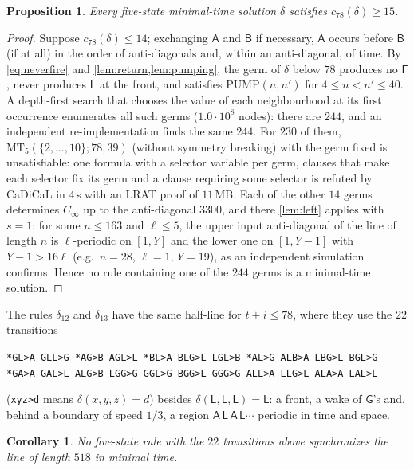 \documentclass[3p]{elsarticle}
\newtheorem{proposition}[theorem]{Proposition}
\newtheorem{corollary}[theorem]{Corollary}
\theoremstyle{definition}
\newcommand{\Lq}{\mathsf L}
\newcommand{\Gq}{\mathsf G}
\newcommand{\Aq}{\mathsf A}
\newcommand{\Bq}{\mathsf B}
\newcommand{\Fq}{\mathsf F}
\begin{document}
\begin{proposition}\label{prop:germs}
Every five-state minimal-time solution $\delta$ satisfies $c_{78}(\delta)\ge15$.
\end{proposition}

\begin{proof}
Suppose $c_{78}(\delta)\le14$; exchanging $\Aq$ and $\Bq$ if necessary, $\Aq$
occurs before $\Bq$ (if at all) in the order of anti-diagonals and, within an
anti-diagonal, of time. By \eqref{eq:neverfire} and
\cref{lem:return,lem:pumping}, the germ of $\delta$ below $78$ produces no
$\Fq$, never produces $\Lq$ at the front, and satisfies $\mathrm{PUMP}(n,n')$
for $4\le n<n'\le40$. A depth-first search that chooses the value of each
neighbourhood at its first occurrence enumerates all such germs
($1.0\cdot10^8$ nodes): there are $244$, and an independent re-implementation
finds the same $244$. For $230$ of them, $\mathrm{MT}_5(\{2,\dots,10\};78,39)$
(without symmetry breaking) with the germ fixed is unsatisfiable: one formula
with a selector variable per germ, clauses that make each selector fix its
germ and a clause requiring some selector is refuted by CaDiCaL in $4$\,s with
an LRAT proof of $11$\,MB. Each of the other $14$ germs determines $C_\infty$
up to the anti-diagonal $3300$, and there \cref{lem:left} applies with $s=1$:
for some $n\le163$ and $\ell\le5$, the upper input anti-diagonal of the line of
length $n$ is $\ell$-periodic on $[1,Y]$ and the lower one on $[1,Y-1]$ with
$Y-1>16\ell$ (e.g.\ $n=28$, $\ell=1$, $Y=19$), as an independent simulation
confirms. Hence no rule containing one of the $244$ germs is a minimal-time
solution.
\end{proof}

The rules $\delta_{12}$ and $\delta_{13}$ have the same half-line for
$t+i\le78$, where they use the $22$ transitions
\begin{center}\small
\texttt{*GL>A GLL>G *AG>B AGL>L *BL>A BLG>L LGL>B *AL>G ALB>A LBG>L BGL>G}\\
\texttt{*GA>A GAL>L ALG>B LGG>G GGL>G BGG>L GGG>G ALL>A LLG>L ALA>A LAL>L}
\end{center}
(\texttt{xyz>d} means $\delta(x,y,z)=d$) besides $\delta(\Lq,\Lq,\Lq)=\Lq$:
a front, a wake of $\Gq$'s and, behind a boundary of speed $1/3$, a region
$\Aq\,\Lq\,\Aq\,\Lq\cdots$ periodic in time and space.

\begin{corollary}\label{cor:germ12}
No five-state rule with the $22$ transitions above synchronizes the line of
length $518$ in minimal time.
\end{corollary}
\end{document}
